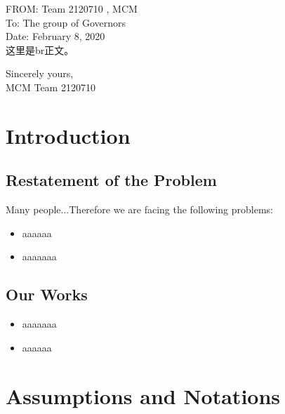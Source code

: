 \documentclass[13pt]{ctexart} %
\begin{document}
\noindent FROM: Team {} 2120710 , MCM\\
\noindent To: The group of Governors\\
\noindent Date: February 8, 2020
\vspace{10pt}
\\
这里是br正文。

\thispagestyle{empty}
{\raggedleft
    Sincerely yours,\\
    MCM Team 2120710\par
}

\newpage
\thispagestyle{empty}
\tableofcontents
\newpage
\setcounter{page}{1}

\fancyhf{}
\fancyhead[C]{ }
\fancyfoot[C]{\bfseries\thepage}
\section{Introduction}
\subsection{Restatement of the Problem}
Many people...Therefore we are facing the following problems:
\begin{itemize}
    \item aaaaaa
    \item aaaaaaa
\end{itemize}

\subsection{Our Works}
\begin{itemize}
    \item aaaaaaa
    \item aaaaaa
\end{itemize}
\fancyfoot[C]{\bfseries\thepage}
\section{Assumptions and Notations}
\vspace{-10pt}
\end{document}
